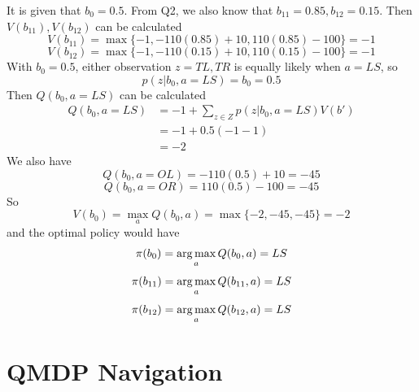 \begin{center}
\end{center}
It is given that $b_0=0.5$. 
From Q2, we also know that $b_{11}=0.85,b_{12}=0.15$.
Then $V(b_{11}),V(b_{12})$ can be calculated
\[V(b_{11})=\max\{-1,-110(0.85)+10,110(0.85)-100\}=-1\]
\[V(b_{12})=\max\{-1,-110(0.15)+10,110(0.15)-100\}=-1\]
With $b_0=0.5$, either observation $z=TL,TR$ is equally likely when $a=LS$,
so 
\[p(z|b_0,a=LS)=b_0=0.5\]
Then $Q(b_0,a=LS)$ can be calculated
\begin{equation}
\begin{aligned}
    Q(b_0,a=LS)
    &=-1+\sum_{z\in Z}p(z|b_0,a=LS)V(b')\\
    &=-1+0.5(-1-1)\\
    &= -2
\end{aligned}
\end{equation}
We also have
\[Q(b_0,a=OL)=-110(0.5)+10=-45\]
\[Q(b_0,a=OR)=110(0.5)-100=-45\]
So
\[V(b_0)=\max_a Q(b_0,a)=\max\{-2,-45,-45\}=-2\]
and the optimal policy would have
\[\pi(b_0)=\operatorname*{arg\,max}_a Q(b_0,a)=LS\]
\[\pi(b_{11})=\operatorname*{arg\,max}_a Q(b_{11},a)=LS\]
\[\pi(b_{12})=\operatorname*{arg\,max}_a Q(b_{12},a)=LS\]

\newpage
\section{QMDP Navigation}

